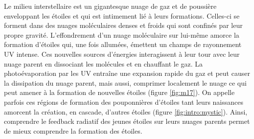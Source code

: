 \documentclass[11pt,a4paper]{article}
\begin{document}
\begin{spacing}{0.98}
Le milieu interstellaire est un gigantesque nuage de gaz et de poussière enveloppant les étoiles et qui est intimement lié à leurs formations. Celles-ci se forment dans des nuages moléculaires denses et froids qui sont confinés par leur propre gravité. L'effondrement d'un nuage moléculaire sur lui-même amorce la formation d'étoiles qui, une fois allumées, émettent un champs de rayonnement UV intense. Ces nouvelles sources d'énergies interagissent à leur tour avec leur nuage parent en dissociant les molécules et en chauffant le gaz. La photoévaporation par les UV entraîne une expansion rapide du gaz et peut causer la dissipation du nuage parent, mais aussi, comprimer localement le nuage ce qui peut amener à la formation de nouvelles étoiles (figure \ref{fig:m17}). On appelle parfois ces régions de formation des \og pouponnières d'étoiles \fg{} tant leurs naissances amorcent la création, en cascade, d'autres étoiles (figure \ref{fig:intro:mystic}). Ainsi, comprendre le feedback radiatif des jeunes étoiles sur leurs nuages parents permet de mieux comprendre la formation des étoiles. \newline 



\end{spacing}
\end{document}
